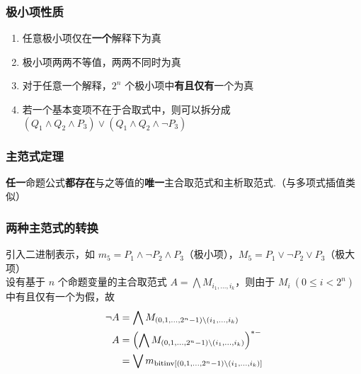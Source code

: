 \documentclass[./main.tex]{subfiles}
\begin{document}
\subsubsection{极小项性质}
\begin{enumerate}
    \item 任意极小项仅在\textbf{一个}解释下为真
    \item 极小项两两不等值，两两不同时为真
    \item 对于任意一个解释，$2^n$ 个极小项中\textbf{有且仅有}一个为真
    \item 若一个基本变项不在于合取式中，则可以拆分成 $(Q_1\wedge Q_2\wedge P_3)\vee(Q_1\wedge Q_2\wedge \neg P_3)$
\end{enumerate}
\subsubsection{主范式定理}
\indent \textbf{任一}命题公式\textbf{都存在}与之等值的\textbf{唯一}主合取范式和主析取范式.\hfill（与多项式插值类似）
\subsubsection{两种主范式的转换}
引入二进制表示，如 $m_5=P_1\wedge\neg P_2\wedge P_3$（极小项），$M_5=P_1\vee\neg P_2\vee P_3$（极大项）\\
\indent 设有基于 $n$ 个命题变量的主合取范式 $A=\bigwedge M_{i_1,\dots,i_k}$，则由于 $M_i\ (0\le i<2^n)$ 中有且仅有一个为假，故
\begin{align}
    \neg A&=\bigwedge M_{(0,1,\dots,2^n-1)\backslash(i_1,\dots,i_k)}\notag \\
    A&=\left(\bigwedge M_{(0,1,\dots,2^n-1)\backslash(i_1,\dots,i_k)}\right)^{*-}\notag
    \\&=\bigvee m_{\text{bitinv}[(0,1,\dots,2^n-1)\backslash(i_1,\dots,i_k)]}
\end{align}
\end{document}
